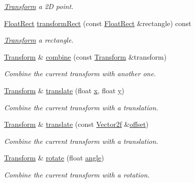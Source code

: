 \begin{DoxyCompactItemize}
\begin{DoxyCompactList}\small\item\em \hyperlink{classsf_1_1_transform}{Transform} a 2\-D point. \end{DoxyCompactList}\item 
\hyperlink{namespacesf_aed4e58f586b2eed2621c0365d0b7554e}{Float\-Rect} \hyperlink{classsf_1_1_transform_a345112559981d988e92b54b7976fca8a}{transform\-Rect} (const \hyperlink{namespacesf_aed4e58f586b2eed2621c0365d0b7554e}{Float\-Rect} \&rectangle) const 
\begin{DoxyCompactList}\small\item\em \hyperlink{classsf_1_1_transform}{Transform} a rectangle. \end{DoxyCompactList}\item 
\hyperlink{classsf_1_1_transform}{Transform} \& \hyperlink{classsf_1_1_transform_acd978f60421a0f839bb9a8263e8877ff}{combine} (const \hyperlink{classsf_1_1_transform}{Transform} \&transform)
\begin{DoxyCompactList}\small\item\em Combine the current transform with another one. \end{DoxyCompactList}\item 
\hyperlink{classsf_1_1_transform}{Transform} \& \hyperlink{classsf_1_1_transform_ab54f6c8070cc05e2afcb3145fbf4395a}{translate} (float \hyperlink{gl3_8h_a92d0386e5c19fb81ea88c9f99644ab1d}{x}, float \hyperlink{gl3_8h_a66ddd433d2cacfe27f5906b7e86faeed}{y})
\begin{DoxyCompactList}\small\item\em Combine the current transform with a translation. \end{DoxyCompactList}\item 
\hyperlink{classsf_1_1_transform}{Transform} \& \hyperlink{classsf_1_1_transform_a452ff6e32d5120fa8c132c1bf0ad83cd}{translate} (const \hyperlink{namespacesf_acf03098c2577b869e2fa6836cc48f1a0}{Vector2f} \&\hyperlink{gl3_8h_ae1b92ae085ddef4b1cdca7d749339fb0}{offset})
\begin{DoxyCompactList}\small\item\em Combine the current transform with a translation. \end{DoxyCompactList}\item 
\hyperlink{classsf_1_1_transform}{Transform} \& \hyperlink{classsf_1_1_transform_a3e548c3c9e3fb9d4bd43cf852669e555}{rotate} (float \hyperlink{_vector3_8h_abd17f37dc7bb5b2bd9a569193ebcdda4}{angle})
\begin{DoxyCompactList}\small\item\em Combine the current transform with a rotation. \end{DoxyCompactList}\item 

\end{DoxyCompactItemize}
